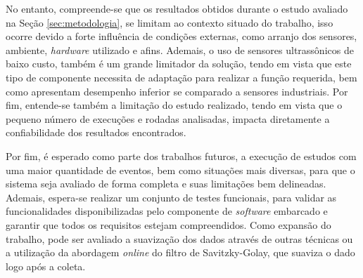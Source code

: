 No entanto, compreende-se que os resultados obtidos durante o estudo avaliado na Seção \ref{sec:metodologia}, se limitam ao contexto situado do trabalho, isso ocorre devido a forte influência de condições externas, como arranjo dos sensores, ambiente, \textit{hardware} utilizado e afins. Ademais, o uso de sensores ultrassônicos de baixo custo, também é um grande limitador da solução, tendo em vista que este tipo de componente necessita de adaptação para realizar a função requerida, bem como apresentam desempenho inferior se comparado a sensores industriais. Por fim, entende-se também a limitação do estudo realizado, tendo em vista que o pequeno número de execuções e rodadas analisadas, impacta diretamente a confiabilidade dos resultados encontrados.

Por fim, é esperado como parte dos trabalhos futuros, a execução de estudos com uma maior quantidade de eventos, bem como situações mais diversas, para que o sistema seja avaliado de forma completa e suas limitações bem delineadas. Ademais, espera-se realizar um conjunto de testes funcionais, para validar as funcionalidades disponibilizadas pelo componente de \textit{software} embarcado e garantir que todos os requisitos estejam compreendidos. Como expansão do trabalho, pode ser avaliado a suavização dos dados através de outras técnicas ou a utilização da abordagem \textit{online} do filtro de Savitzky-Golay, que suaviza o dado logo após a coleta.

